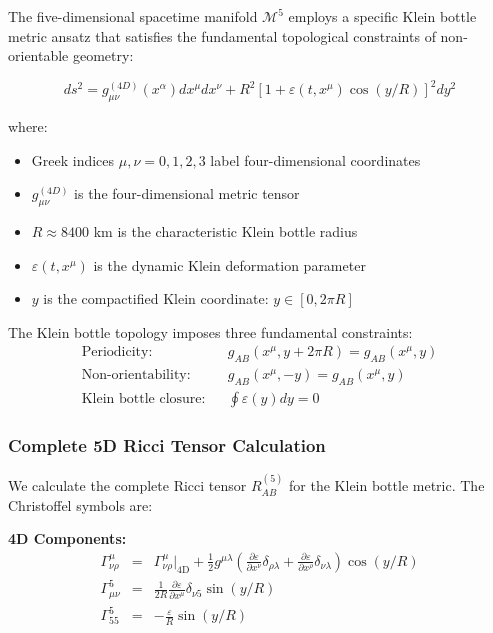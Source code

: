 \documentclass[12pt]{iopart}
\begin{document}
The five-dimensional spacetime manifold $\mathcal{M}^5$ employs a specific Klein bottle metric ansatz that satisfies the fundamental topological constraints of non-orientable geometry:

\begin{equation}
ds^2 = g_{\mu\nu}^{(4D)}(x^\alpha) dx^\mu dx^\nu + R^2[1 + \varepsilon(t,x^\mu)\cos(y/R)]^2 dy^2
\label{eq:5d_metric_ansatz}
\end{equation}

where:
\begin{itemize}
\item Greek indices $\mu,\nu = 0,1,2,3$ label four-dimensional coordinates
\item $g_{\mu\nu}^{(4D)}$ is the four-dimensional metric tensor
\item $R \approx 8400$ km is the characteristic Klein bottle radius
\item $\varepsilon(t,x^\mu)$ is the dynamic Klein deformation parameter
\item $y$ is the compactified Klein coordinate: $y \in [0, 2\pi R]$
\end{itemize}

The Klein bottle topology imposes three fundamental constraints:
\begin{eqnarray}
\text{Periodicity:} && g_{AB}(x^\mu, y + 2\pi R) = g_{AB}(x^\mu, y) \label{eq:periodicity}\\
\text{Non-orientability:} && g_{AB}(x^\mu, -y) = g_{AB}(x^\mu, y) \label{eq:non_orientable}\\
\text{Klein bottle closure:} && \oint \varepsilon(y) dy = 0 \label{eq:klein_closure}
\end{eqnarray}

\subsubsection{Complete 5D Ricci Tensor Calculation}

We calculate the complete Ricci tensor $R_{AB}^{(5)}$ for the Klein bottle metric. The Christoffel symbols are:

\textbf{4D Components:}
\begin{eqnarray}
\Gamma^{\mu}_{\nu\rho} &=& \Gamma^{\mu}_{\nu\rho}|_{\text{4D}} + \frac{1}{2}g^{\mu\lambda}\left(\frac{\partial \varepsilon}{\partial x^\nu}\delta_{\rho\lambda} + \frac{\partial \varepsilon}{\partial x^\rho}\delta_{\nu\lambda}\right)\cos(y/R) \\
\Gamma^{5}_{\mu\nu} &=& \frac{1}{2R}\frac{\partial \varepsilon}{\partial x^\mu}\delta_{\nu 5} \sin(y/R) \\
\Gamma^{5}_{55} &=& -\frac{\varepsilon}{R}\sin(y/R)
\end{eqnarray}
\end{document}
